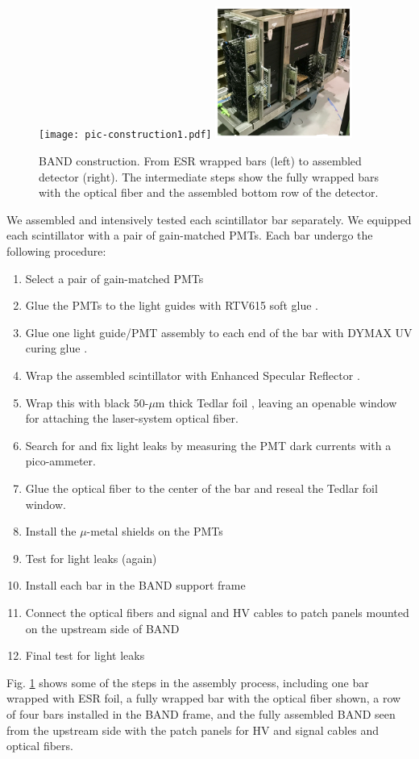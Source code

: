 \documentclass[3p,final,twocolumn]{elsarticle}
\begin{document}
\begin{figure}[tbp]
	\centering
	\texttt{[image: pic-construction1.pdf]}
	\includegraphics[width=0.40\textwidth , height=0.40\textwidth]{pic-construction2.pdf}
				\caption{BAND construction. From ESR \cite{3MESR} wrapped bars (left) to assembled detector (right). The intermediate steps show the fully wrapped bars with the optical fiber and the assembled bottom row of the detector.}
		\label{fig:barassembly}
\end{figure}

We assembled and intensively tested each scintillator bar
separately. We equipped each scintillator with a pair of gain-matched
PMTs.  Each bar undergo the following procedure:
\begin{enumerate}
\item Select a pair of gain-matched PMTs
\item Glue the PMTs to the light guides with RTV615 soft glue \cite{softglue}.
\item Glue one light guide/PMT assembly to each end of the bar with DYMAX
  UV curing glue \cite{uvglue}.
\item Wrap the assembled scintillator with Enhanced Specular Reflector \cite{3MESR}.
\item Wrap this with black 50-$\mu$m thick Tedlar foil \cite{tedlarfoil}, leaving an openable
  window for attaching the laser-system optical fiber.
\item Search for and fix light leaks by measuring the PMT dark currents with a pico-ammeter.
\item Glue the optical fiber to the center of the bar and reseal the Tedlar foil window.
\item Install the $\mu$-metal shields on the PMTs 
\item Test for light leaks (again)
\item Install each bar in the BAND support frame
\item Connect the optical fibers and signal and HV cables to patch panels mounted on the upstream side of BAND
\item Final test for light leaks
\end{enumerate}
Fig. \ref{fig:barassembly} shows some of the steps in the assembly process,
including one bar wrapped with ESR foil, a fully wrapped bar with the
optical fiber shown, a row of four bars installed in the BAND frame,
and the fully assembled BAND seen from the upstream side with the
patch panels for HV and  signal cables and optical fibers.
\end{document}
